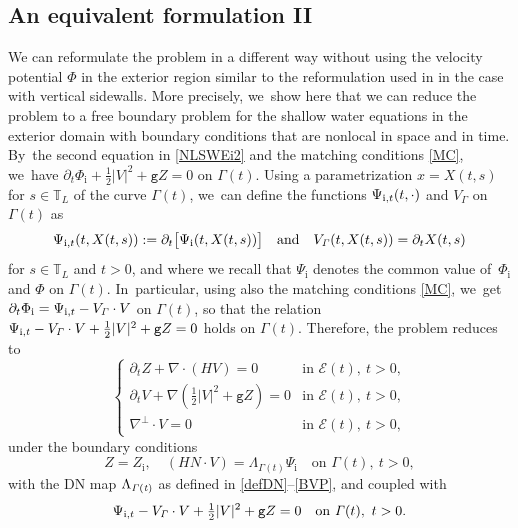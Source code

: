 \documentclass[JEP,XML,SOM,Unicode,NoFloatCountersInSection,published]{cedram}
\newcommand{\gr}{{\mathtt g}}
\newcommand{\dt}{\partial_t}
\newcommand{\cE}{{\mathcal E}}
\newcommand{\itGamma}{\mathit{\Gamma}}
\theoremstyle{definition}
\begin{document}
\subsection{An equivalent formulation II}\label{subsect:EF2}
We can reformulate the problem in a different way without using the velocity potential $\Phi$ in the exterior region similar to the reformulation used in
\cite[Section 5.1]{IguchiLannes2023} in the case with vertical sidewalls.
More precisely, we~show here that we can reduce the problem to a free boundary problem for the shallow water equations in the exterior domain
with boundary conditions that are nonlocal in space and in time. By~the second equation in \eqref{NLSWEi2} and the matching conditions \eqref{MC}, we~have $\dt\Phi_\mathrm{i}+\frac12|V|^2+\gr Z=0$ on $\itGamma(t)$.
Using a parametrization $x=X(t,s)$ for $s\in {\mathbb T}_L$ of the curve $\itGamma(t)$, we~can define the functions $\Psi_{{\rm i},t}(t,\cdot)$ and $V_{\itGamma}$ on $\itGamma(t)$ as
\[
\Psi_{{\rm i},t}(t,X(t,s)):=\partial_t \bigl[ \Psi_\mathrm{i}(t,X(t,s))\bigr] \quad\mbox{and}\quad V_\itGamma(t,X(t,s))=\dt X(t,s)
\]
for $s\in {\mathbb T}_L$ and $t>0$, and where we recall that $\Psi_\mathrm{i}$ denotes the common value of~$\Phi_\mathrm{i}$ and $\Phi$ on $\itGamma(t)$. In~particular, using also the matching conditions \eqref{MC}, we~get $\dt \Phi_\mathrm{i}=\Psi_{{\rm i},t} - V_\itGamma\cdot V$ on $\itGamma(t)$,
so that the relation $\Psi_{{\rm i},t} - V_\itGamma\cdot V+\tfrac12|V|^2+\gr Z=0$ holds on $\itGamma(t)$.
Therefore, the problem reduces to
\begin{equation}\label{NLSWEe4}
\begin{cases}
\dt Z+\nabla\cdot(HV) = 0 &\text{in } \cE(t), \ t>0, \\
\dt V+\nabla(\frac12|V|^2+\gr Z) = 0 &\text{in } \cE(t), \ t>0, \\
\nabla^\perp\cdot V = 0 &\text{in } \cE(t), \ t>0,
\end{cases}
\end{equation}
under the boundary conditions
\begin{equation}\label{BC4}
Z=Z_\mathrm{i}, \quad (HN\cdot V) = \Lambda_{\itGamma(t)}\Psi_\mathrm{i} \quad\text{on } \itGamma(t), \ t>0,
\end{equation}
with the DN map $\Lambda_{\it\Gamma(t)}$ as defined in \eqref{defDN}--\eqref{BVP}, and coupled with
\begin{equation}\label{ODE}
\Psi_{{\rm i},t} - V_\itGamma\cdot V+\tfrac12 |V|^2+\gr Z=0 \quad\text{on } \itGamma(t), \ t>0.
\end{equation}
\end{document}

